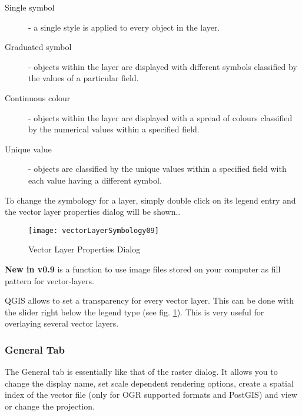 \begin{description}
    \item[Single symbol] - a single style is applied to every
    object in the layer.
    \item[Graduated symbol] - objects within the layer are
    displayed with different symbols classified by the values of a
    particular field.
    \item[Continuous colour] - objects within the layer are
    displayed with a spread of colours classified by the numerical
    values within a specified field.
    \item[Unique value] - objects are classified by the unique
    values within a specified field with each value having a
    different symbol.
\end{description}

To change the symbology for a layer, simply double click on its legend 
entry and the vector layer properties dialog will be 
shown..

\begin{figure}[H]
   \begin{center}
   \caption{Vector Layer Properties
Dialog}\label{fig:vector_symbology}\smallskip
   \texttt{[image: vectorLayerSymbology09]} 
\end{center}  
\end{figure}

\textbf{New in v0.9} is a function to use image files stored on your computer 
as fill pattern for vector-layers.

 \label{sec:vect_transparency} 
QGIS \CURRENT allows to set a transparency for every vector layer. This can be done with
the slider right below the legend type (see fig. \ref{fig:vector_symbology}).
This is very useful for overlaying several vector layers.

\subsubsection{General Tab}
The General tab is essentially like that of the raster dialog. It allows you
to change the display name, set scale dependent rendering options, create a spatial 
index of the vector file (only for OGR supported formats and PostGIS) and view or
change the projection.

